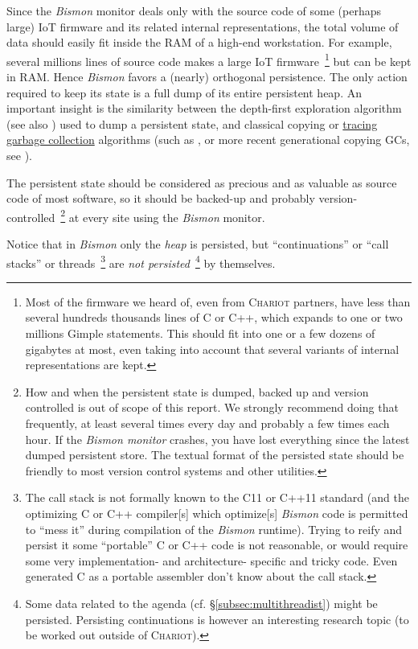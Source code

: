 Since the \emph{Bismon} monitor deals only with the source code of
some (perhaps large) IoT firmware and its related internal
representations, the total volume of data should easily fit inside the
RAM of a high-end workstation. For example, several millions lines of
source code makes a large IoT firmware~\footnote{Most of the firmware
we heard of, even from \textsc{Chariot} partners, have less than
several hundreds thousands lines of C or C++, which expands to one or
two millions Gimple statements. This should fit into one or a few
dozens of gigabytes at most, even taking into account that several
variants of internal representations are kept.} but can be kept in
RAM. Hence \emph{Bismon} favors a (nearly) orthogonal persistence. The
only action required to keep its state is a full dump of its entire
persistent heap. An important insight is the similarity between the
depth-first  
 exploration  algorithm
 (see also \cite{Cormen:2009:Intro-algo,
  Christian:2017:algorithms}) used to dump  a persistent
 state, and classical copying or
\href{https://en.wikipedia.org/wiki/Tracing\_garbage\_collection}{tracing
  garbage collection} 
 
algorithms (such as \cite{Cheney:1970:CopyingGc}, or more recent
generational copying GCs, see \cite{Jones:2016:GC-handbook}).

The persistent state should be considered as precious and as valuable
as source code of most software, so it should be backed-up and
probably version-controlled~\footnote{How and when the persistent
  state is dumped, backed up and version controlled is out of scope of
  this report. We strongly recommend doing that frequently, at least
  several times every day and probably a few times each hour. If the
  \textit{Bismon monitor} crashes, you have lost everything since the
  latest dumped persistent store. The textual format of the persisted
  state should be friendly to most version control systems and other
  utilities.} at every site using the \emph{Bismon} monitor.

Notice that in \emph{Bismon} only the \emph{heap} is persisted, but
``continuations'' or ``call stacks'' or threads~\footnote{The call
  stack is not formally known to the C11 or C++11 standard (and the
  optimizing C or C++ compiler[s] which optimize[s] \emph{Bismon} code
  is permitted to ``mess it'' during compilation of the \emph{Bismon}
  runtime). Trying to reify and persist it some ``portable'' C or C++
  code is not reasonable, or would require some very implementation-
  and architecture- specific and tricky code. Even generated C as a
  portable assembler don't know about the call stack.}  are \emph{not
  persisted}~\footnote{Some data related to the agenda
  (cf. \S\ref{subsec:multithreadist}) might be persisted. Persisting
  continuations is however an interesting research topic (to be
  worked out outside of \textsc{Chariot}).} by themselves.

